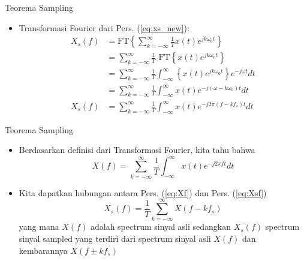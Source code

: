 \documentclass[pdflatex,compress,mathserif]{beamer}
\begin{document}
\begin{frame}{Teorema Sampling}
    \begin{itemize}
        \item Transformasi Fourier dari Pers. (\ref{eq:xs_new}):
        \begin{align}
            X_s(f) &= \text{FT} \left\{ \sum_{k = -\infty}^{\infty} \frac{1}{T} x(t) e^{jk\omega_0t} \right\} \\
            &= \sum_{k = -\infty}^{\infty} \frac{1}{T} \text{ FT} \left\{ x(t) e^{jk\omega_0t} \right\} \\
            &= \sum_{k = -\infty}^{\infty} \frac{1}{T} \int_{-\infty}^{\infty} \left\{ x(t) e^{jk\omega_0t} \right\}e^{-j\omega t} dt\\
            &= \sum_{k = -\infty}^{\infty} \frac{1}{T} \int_{-\infty}^{\infty} x(t) e^{-j(\omega-k\omega_0) t} dt \\
            X_s(f) &= \sum_{k = -\infty}^{\infty} \frac{1}{T} \int_{-\infty}^{\infty} x(t) e^{-j2\pi(f-kf_s) t} dt
            \label{eq:Xsf}
        \end{align}
    \end{itemize}
\end{frame}

\begin{frame}{Teorema Sampling}
    \begin{itemize}
        \item Berdasarkan definisi dari Transformasi Fourier, kita tahu bahwa
        \begin{equation}
            X(f) = \sum_{k = -\infty}^{\infty} \frac{1}{T} \int_{-\infty}^{\infty} x(t) e^{-j2\pi ft} dt
            \label{eq:Xf}
        \end{equation}
        \item Kita dapatkan hubungan antara Pers. (\ref{eq:Xf}) dan Pers. (\ref{eq:Xsf})
        \begin{equation}
            X_s(f) = \frac{1}{T} \sum_{k = -\infty}^{\infty} X(f - kf_s)
            \label{eq:Xsf_and_Xf}
        \end{equation}
        yang mana $X(f)$ adalah spectrum sinyal asli sedangkan $X_s(f)$ spectrum sinyal sampled yang terdiri dari spectrum sinyal asli $X(f)$ dan kembarannya $X(f\pm kf_s)$
    \end{itemize}
\end{frame}
\end{document}
